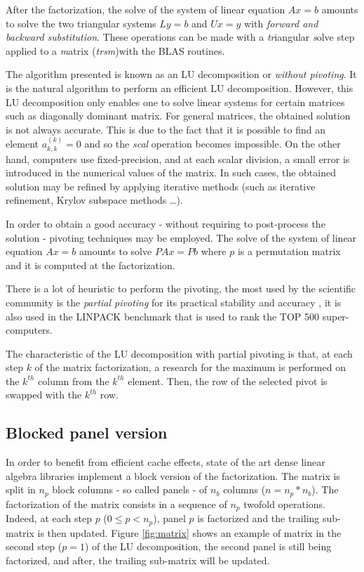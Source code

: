 After the factorization, the solve of the system of linear equation $Ax=b$ amounts to solve the two triangular systems $Ly=b$ and $Ux=y$ with \emph{forward and backward substitution}. These operations can be made with a \emph{tr}iangular \emph{s}olve step applied to a \emph{m}atrix (\emph{trsm})with the BLAS routines.

The algorithm presented is known as an LU decomposition or \emph{without pivoting}. It is the natural algorithm to perform an efficient LU decomposition. However, this LU decomposition only enables one to solve linear systems for certain matrices such as diagonally dominant matrix. For general matrices, the obtained solution is not always accurate. This is due to the fact that it is possible to find an element $a_{k,k}^{(k)} = 0$ and so the \emph{scal} operation becomes impossible. On the other hand, computers use fixed-precision, and at each scalar division, a small error is introduced in the numerical values of the matrix. In such cases, the obtained solution may be refined by applying iterative methods (such as iterative refinement, Krylov subspace methods \dots).

In order to obtain a good accuracy - without requiring to post-process the solution - pivoting techniques may be employed. The solve of the system of linear equation $Ax=b$ amounts to solve $PAx=Pb$ where $p$ is a permutation matrix and it is computed at the factorization.

There is a lot of heuristic to perform the pivoting, the most used by the scientific community is the \emph{partial pivoting} for its practical stability and accuracy \cite{Hig02}, it is also used in the LINPACK benchmark that is used to rank the TOP 500 super-computers.

The characteristic of the LU decomposition with partial pivoting is that, at each step $k$ of the matrix factorization, a research for the maximum is performed on the $k^{th}$ column from the $k^{th}$ element. Then, the row of the selected pivot is swapped with the $k^{th}$ row.

\subsection*{Blocked panel version}

In order to benefit from efficient cache effects, state of the art dense linear algebra libraries implement a block version of the factorization. The matrix is split in $n_p$ block columns - so called panels - of $n_b$ columns ($n = n_p * n_b$). The factorization of the matrix consists in a sequence of $n_p$ twofold operations. Indeed, at each step $p$ ($0 \leq p < n_p$), panel $p$ is factorized and the trailing sub-matrix is then updated. Figure \ref{fig:matrix} shows an example of matrix in the second step ($p=1$) of the LU decomposition, the second panel is still being factorized, and after, the trailing sub-matrix will be updated.

